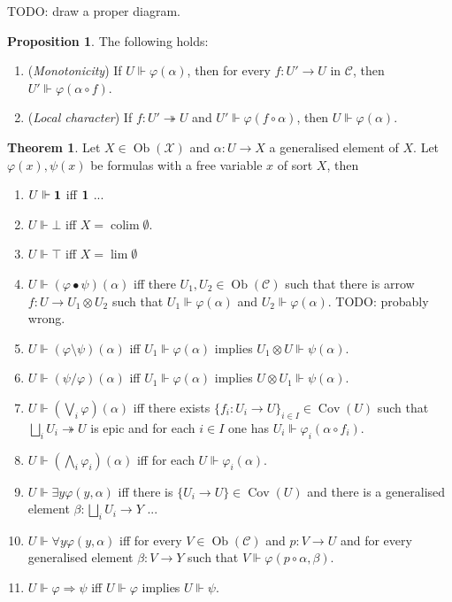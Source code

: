 \documentclass[8pt]{article}
\theoremstyle{definition}
\theoremstyle{definition}
\newtheorem{theorem}{Theorem}[section]
\theoremstyle{definition}
\theoremstyle{definition}
\theoremstyle{definition}
\theoremstyle{definition}
\theoremstyle{definition}
\newtheorem{prop}{Proposition}[section]
\theoremstyle{definition}
\theoremstyle{definition}
\theoremstyle{definition}
\theoremstyle{definition}
\theoremstyle{definition}
\theoremstyle{definition}
\theoremstyle{question}
\DeclareMathOperator*{\colim}{\operatorname{colim}}
\newcommand{\Ob}[1]{\operatorname{Ob}({\mathcal{#1}})}
\begin{document}
TODO: draw a proper diagram.

\begin{prop} The following holds:

  \begin{enumerate}
    \item (\emph{Monotonicity}) If $U \Vdash \varphi(\alpha)$, then for every $f : U' \to U$ in $\mathcal{C}$,
    then $U' \Vdash \varphi(\alpha \circ f)$.
    \item (\emph{Local character}) If $f : U' \twoheadrightarrow U$ and $U' \Vdash \varphi(f \circ \alpha)$,
    then $U \Vdash \varphi(\alpha)$.
  \end{enumerate}
\end{prop}

\begin{theorem}
  Let $X \in \Ob{X}$ and $\alpha : U \to X$ a generalised element of $X$.
  Let $\varphi(x), \psi(x)$ be formulas with a free variable $x$ of sort $X$,
  then
  \begin{enumerate}
    \item $U \Vdash {\bf 1}$ iff ${\bf 1}$ ...
    \item $U \Vdash \bot$ iff $X = \colim \emptyset$.
    \item $U \Vdash \top$ iff $X = \lim \emptyset$
    \item $U \Vdash (\varphi \bullet \psi)(\alpha)$ iff there $U_1, U_2 \in \Ob{C}$ such that there is arrow
    $f : U \to U_1 \otimes U_2$ such that $U_1 \Vdash \varphi(\alpha)$ and $U_2 \Vdash \varphi(\alpha)$. TODO: probably wrong.
    \item $U \Vdash (\varphi \setminus \psi)(\alpha)$ iff $U_1 \Vdash \varphi(\alpha)$ implies $U_1 \otimes U \Vdash \psi(\alpha)$.
    \item $U \Vdash (\psi / \varphi)(\alpha)$ iff $U_1 \Vdash \varphi(\alpha)$ implies $U \otimes U_1 \Vdash \psi(\alpha)$.
    \item $U \Vdash (\bigvee \limits_i \varphi)(\alpha)$ iff there exists $\{ f_i : U_i \to U \}_{i \in I} \in \operatorname{Cov}(U)$
    such that $\bigsqcup \limits_i U_i \twoheadrightarrow U$ is epic
    and for each $i \in I$ one has $U_i \Vdash \varphi_i(\alpha \circ f_i)$.
    \item $U \Vdash (\bigwedge \limits_i \varphi_i)(\alpha)$ iff for each $U \Vdash \varphi_i(\alpha)$.
    \item $U \Vdash \exists y \varphi(y, \alpha)$ iff there is $\{ U_i \to U \} \in \operatorname{Cov}(U)$
    and there is a generalised element $\beta : \bigsqcup \limits_i U_i \to Y$ ...
    \item $U \Vdash \forall y \varphi(y, \alpha)$ iff for every $V \in \Ob{C}$ and $p : V \to U$
    and for every generalised element $\beta : V \to Y$ such that $V \Vdash \varphi(p \circ \alpha, \beta)$.
    \item $U \Vdash \varphi \Rightarrow \psi$ iff $U \Vdash \varphi$ implies $U \Vdash \psi$.
  \end{enumerate}
\end{theorem}
\end{document}
